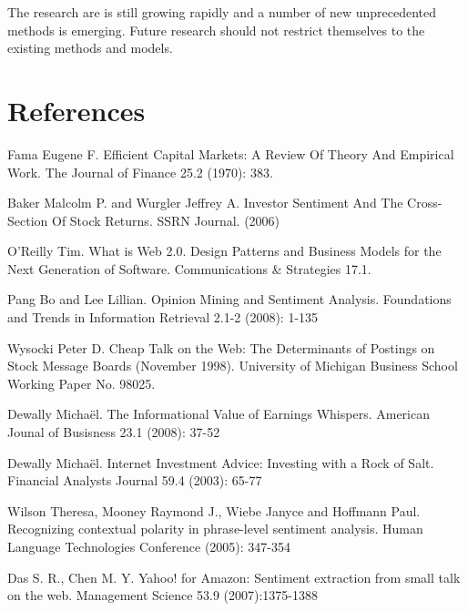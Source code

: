 The research are is still growing rapidly and a number of new unprecedented methods is emerging. Future research should not restrict themselves to the existing methods and models.

\section*{References}

\begin{enumerate}[{$[$}1{$]$}]
  \item Fama Eugene F. Efficient Capital Markets: A Review Of Theory And Empirical Work. The Journal of Finance 25.2 (1970): 383.
  \item Baker Malcolm P. and Wurgler Jeffrey A. Investor Sentiment And The Cross-Section Of Stock Returns. SSRN Journal. (2006)
  \item O'Reilly Tim. What is Web 2.0. Design Patterns and Business Models for the Next Generation of Software. Communications \& Strategies 17.1.
  \item Pang Bo and Lee Lillian. Opinion Mining and Sentiment Analysis. Foundations and Trends in Information Retrieval 2.1-2 (2008): 1-135
  \item Wysocki Peter D. Cheap Talk on the Web: The Determinants of Postings on Stock Message Boards (November 1998). University of Michigan Business School Working Paper No. 98025.
  \item Dewally Micha\"{e}l. The Informational Value of Earnings Whispers. American Jounal of Busisness 23.1 (2008): 37-52
  \item Dewally Micha\"{e}l. Internet Investment Advice: Investing with a Rock of Salt. Financial Analysts Journal 59.4 (2003): 65-77
  \item Wilson Theresa, Mooney Raymond J., Wiebe Janyce and Hoffmann Paul. Recognizing contextual polarity in phrase-level sentiment analysis. Human Language Technologies Conference (2005): 347-354
  \item Das S. R., Chen M. Y. Yahoo! for Amazon: Sentiment extraction from small talk on the web. Management Science 53.9 (2007):1375-1388
\end{enumerate}
